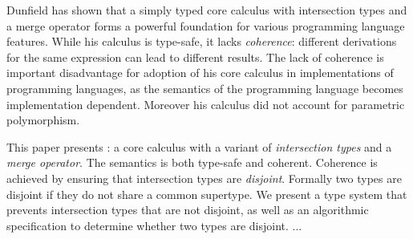 Dunfield has shown that a simply typed core calculus with
intersection types and a merge operator forms a powerful foundation
for various programming language features. While his calculus
is type-safe, it lacks \emph{coherence}:
different derivations for the same expression can lead to different
results. The lack of coherence is important disadvantage for adoption
of his core calculus in implementations of programming languages, as
the semantics of the programming language becomes implementation
dependent. Moreover his calculus did not account for parametric polymorphism.

This paper presents \namedis: a core calculus with a variant of
\emph{intersection types} and a
\emph{merge operator}. The semantics \namedis is both type-safe and
coherent. Coherence is achieved by ensuring that intersection types
are \emph{disjoint}. Formally two types are disjoint if they do not
share a common supertype. We present a type system that prevents
intersection types that are not disjoint, as well as an algorithmic
specification to determine whether two types are disjoint. ...
